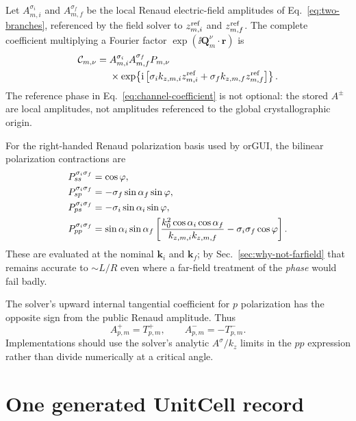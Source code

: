 Let $A_{m,i}^{\sigma_i}$ and $A_{m,f}^{\sigma_f}$ be the local Renaud
electric-field amplitudes of Eq.~\eqref{eq:two-branches}, referenced by the
field solver to $z_{m,i}^{\rm ref}$ and $z_{m,f}^{\rm ref}$.  The complete
coefficient multiplying a Fourier factor $\exp(\ii\bm Q_m^\nu\cdot\bm r)$ is
\begin{align}
  \mathcal C_{m,\nu}
  ={}&A_{m,i}^{\sigma_i}A_{m,f}^{\sigma_f}
  P_{m,\nu}\nonumber\\
  &\times\exp\!\left\{
    \mathrm{i}\left[
      \sigma_i k_{z,m,i}z_{m,i}^{\rm ref}
      +\sigma_f k_{z,m,f}z_{m,f}^{\rm ref}
    \right]
  \right\}.
  \label{eq:channel-coefficient}
\end{align}
The reference phase in Eq.~\eqref{eq:channel-coefficient} is not optional: the
stored $A^\pm$ are local amplitudes, not amplitudes referenced to the global
crystallographic origin.

For the right-handed Renaud polarization basis used by orGUI, the bilinear
polarization contractions are
\begin{align}
  P_{ss}^{\sigma_i\sigma_f}
    &=\cos\varphi,\nonumber\\
  P_{sp}^{\sigma_i\sigma_f}
    &=-\sigma_f\sin\alpha_f\sin\varphi,\nonumber\\
  P_{ps}^{\sigma_i\sigma_f}
    &=-\sigma_i\sin\alpha_i\sin\varphi,\nonumber\\
  P_{pp}^{\sigma_i\sigma_f}
    &=\sin\alpha_i\sin\alpha_f
      \left[
        \frac{k_0^2\cos\alpha_i\cos\alpha_f}
             {k_{z,m,i}k_{z,m,f}}
        -\sigma_i\sigma_f\cos\varphi
      \right].
  \label{eq:polarization-contractions}
\end{align}
These are evaluated at the nominal $\bm k_i$ and $\bm k_f$; by
Sec.~\ref{sec:why-not-farfield} that remains accurate to $\sim L/R$ even where
a far-field treatment of the \emph{phase} would fail badly.

The solver's upward internal tangential coefficient for $p$ polarization has
the opposite sign from the public Renaud amplitude.  Thus
\begin{equation}
  A_{p,m}^{+}=T_{p,m}^{+},
  \qquad
  A_{p,m}^{-}=-T_{p,m}^{-}.
  \label{eq:p-sign}
\end{equation}
Implementations should use the solver's analytic $A^\sigma/k_z$ limits in the
$pp$ expression rather than divide numerically at a critical angle.

\section{One generated UnitCell record}

